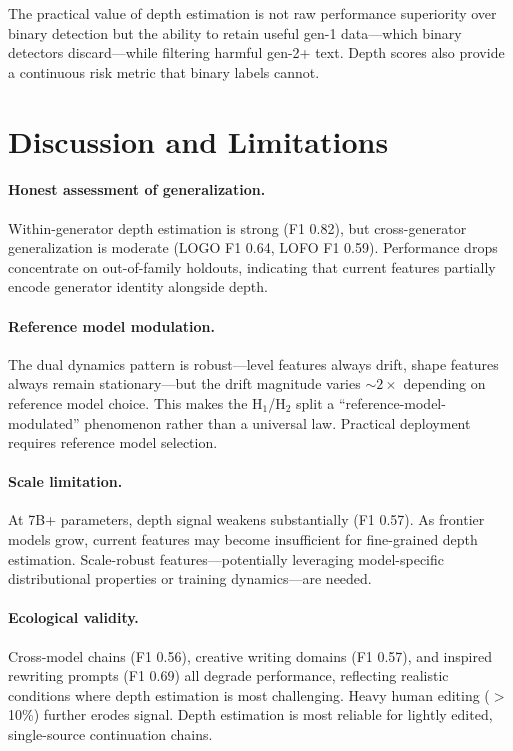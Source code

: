 \documentclass[letterpaper]{article}
\begin{document}
The practical value of depth estimation is not raw performance superiority over binary detection but the ability to retain useful gen-1 data---which binary detectors discard---while filtering harmful gen-2+ text.
Depth scores also provide a continuous risk metric that binary labels cannot.

\section{Discussion and Limitations}
\label{sec:discussion}

\paragraph{Honest assessment of generalization.}
Within-generator depth estimation is strong (F1 0.82), but cross-generator generalization is moderate (LOGO F1 0.64, LOFO F1 0.59).
Performance drops concentrate on out-of-family holdouts, indicating that current features partially encode generator identity alongside depth.

\paragraph{Reference model modulation.}
The dual dynamics pattern is robust---level features always drift, shape features always remain stationary---but the drift magnitude varies ${\sim}2\times$ depending on reference model choice.
This makes the H$_1$/H$_2$ split a ``reference-model-modulated'' phenomenon rather than a universal law.
Practical deployment requires reference model selection.

\paragraph{Scale limitation.}
At 7B+ parameters, depth signal weakens substantially (F1 0.57).
As frontier models grow, current features may become insufficient for fine-grained depth estimation.
Scale-robust features---potentially leveraging model-specific distributional properties or training dynamics---are needed.

\paragraph{Ecological validity.}
Cross-model chains (F1 0.56), creative writing domains (F1 0.57), and inspired rewriting prompts (F1 0.69) all degrade performance, reflecting realistic conditions where depth estimation is most challenging.
Heavy human editing (${>}$10\%) further erodes signal.
Depth estimation is most reliable for lightly edited, single-source continuation chains.
\end{document}
